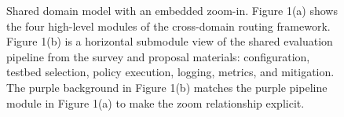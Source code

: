 \begin{figure}[!t]
{%
}
\caption{Shared domain model with an embedded zoom-in. Figure 1(a) shows the four high-level modules of the cross-domain routing framework. Figure 1(b) is a horizontal submodule view of the shared evaluation pipeline from the survey and proposal materials: configuration, testbed selection, policy execution, logging, metrics, and mitigation. The purple background in Figure 1(b) matches the purple pipeline module in Figure 1(a) to make the zoom relationship explicit.}
\label{fig:domain_model}
\end{figure}
